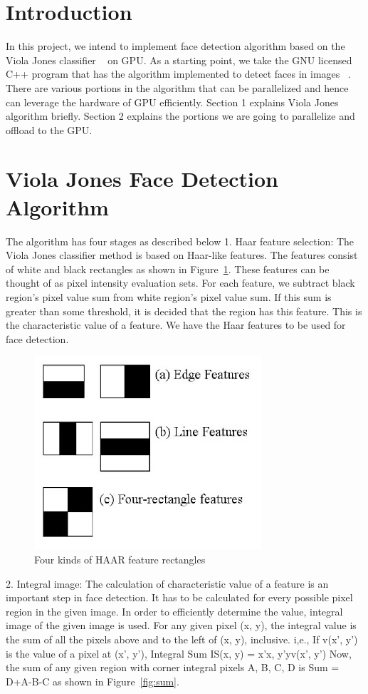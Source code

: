 \section{Introduction}\label{sec:algo}
In this project, we intend to implement face detection algorithm based on the Viola Jones 
classifier ~\cite{viola_jones} on GPU. As a starting point, we take the GNU licensed C++ program that has the algorithm 
implemented to detect faces in images ~\cite{project_link}. There are various portions in the algorithm that can be 
parallelized and hence can leverage the hardware of GPU efficiently. 
Section 1 explains Viola Jones algorithm briefly. 
Section 2 explains the portions we are going to parallelize and offload to the GPU.

\section{Viola Jones Face Detection Algorithm}
The algorithm has four stages as described below
1. Haar feature selection: 
The Viola Jones classifier method is based on Haar-like features. The features consist of 
white and black rectangles as shown in Figure~\ref{fig:haar}. These features can be thought of as pixel intensity evaluation sets. 
For each feature, we subtract black region’s pixel value sum from white region’s pixel value sum. 
If this sum is greater than some threshold, it is decided that the region has this feature. 
This is the characteristic value of a feature. We have the Haar features to be used for face detection.

\begin{figure}[h]
  \includegraphics[width=0.45\linewidth]{figs/haar.jpg}
  \caption{Four kinds of HAAR feature rectangles \textnormal{\small }  }
  \label{fig:haar}
\end{figure}

2. Integral image: The calculation of characteristic value of a feature is an important step in 
face detection. It has to be calculated for every possible pixel region in the given image. 
In order to efficiently determine the value, integral image of the given image is used. 
For any given pixel (x, y), the integral value is the sum of all the pixels above and to 
the left of (x, y), inclusive.
i,e., If v(x’, y’) is the value of a pixel at (x’, y’), Integral Sum
IS(x, y) = x'x, y'yv(x’, y’)
Now, the sum of any given region with corner integral pixels A, B, C, D is
Sum = D+A-B-C as shown in Figure~\ref{fig:sum}.

